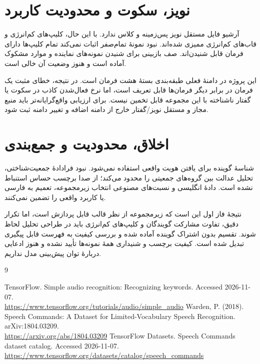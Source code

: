 \documentclass[11pt,a4paper]{article}
\begin{document}
\section{نویز، سکوت و محدودیت کاربرد}
آرشیو  فایل مستقل نویز پس‌زمینه و کلاس  ندارد. با این حال، کلیپ‌های کم‌انرژی و قاب‌های کم‌انرژی ممیزی شده‌اند. نبود نمونهٔ تمام‌صفر اثبات نمی‌کند تمام کلیپ‌ها دارای فرمان قابل شنیدن‌اند. صف بازبینی برای شنیدن نمونه‌های نماینده و موارد مشکوک آماده است و هنوز وضعیت آن خالی است.

این پروژه در دامنهٔ فعلی طبقه‌بندی بستهٔ هشت فرمان است. در نتیجه، خطای مثبت یک فرمان در برابر دیگر فرمان‌ها قابل تعریف است، اما نرخ فعال‌شدن کاذب در سکوت یا گفتار ناشناخته با این مجموعه قابل تخمین نیست. برای ارزیابی واقع‌گرایانه‌تر باید منبع مجاز و مستقل نویز/گفتار خارج از دامنه اضافه و تغییر دامنه ثبت شود.

\section{اخلاق، محدودیت و جمع‌بندی}
شناسهٔ گوینده برای یافتن هویت واقعی استفاده نمی‌شود. نبود فرادادهٔ جمعیت‌شناختی، تحلیل عدالت بین گروه‌های جمعیتی را محدود می‌کند؛ از صدا برچسب حساس استنباط نشده است. دادهٔ انگلیسی و نسبت‌های مصنوعی انتخاب زیرمجموعه، تعمیم به فارسی یا کاربرد واقعی را تضمین نمی‌کنند.

نتیجهٔ فاز اول این است که زیرمجموعه از نظر قالب قابل پردازش است، اما تکرار دقیق، تفاوت مشارکت گویندگان و کلیپ‌های کم‌انرژی باید در طراحی تحلیل لحاظ شوند. تقسیم بدون اشتراک گوینده آماده شده و بررسی کیفیت به فهرست قابل پیگیری تبدیل شده است. کیفیت برچسب و شنیداری همهٔ نمونه‌ها تأیید نشده و هنوز ادعایی دربارهٔ توان پیش‌بینی مدل نداریم.

\newpage
\begin{thebibliography}{9}
\begin{LTR}
 TensorFlow. Simple audio recognition: Recognizing keywords. Accessed 2026-11-07.\\\url{https://www.tensorflow.org/tutorials/audio/simple_audio}
 Warden, P. (2018). Speech Commands: A Dataset for Limited-Vocabulary Speech Recognition. arXiv:1804.03209.\\\url{https://arxiv.org/abs/1804.03209}
 TensorFlow Datasets. Speech Commands dataset catalog. Accessed 2026-11-07.\\\url{https://www.tensorflow.org/datasets/catalog/speech_commands}
\end{LTR}
\end{thebibliography}
\end{document}
